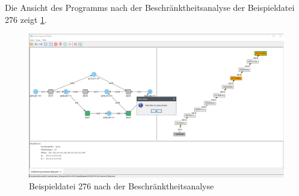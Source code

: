 Die Ansicht des Programms nach der Beschränktheitsanalyse der Beispieldatei 276 zeigt \cref{img:ex276_default}.

\begin{figure}[H]
  \includegraphics[width=\textwidth]{../img/Screenshot_276_default_layout.png}
  \caption{Beispieldatei 276 nach der Beschränktheitsanalyse}
  \label{img:ex276_default}
\end{figure}
